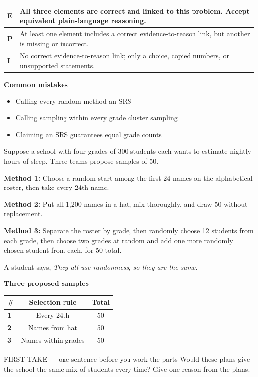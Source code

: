 \documentclass[11pt]{article}
\begin{document}
{\small\renewcommand{\arraystretch}{1.25}
\noindent\begin{tabular}{|p{0.5in}|p{5.9in}|}
\hline
\textbf{E} & All three elements are correct and linked to this problem. Accept equivalent plain-language reasoning. \\ \hline
\textbf{P} & At least one element includes a correct evidence-to-reason link, but another is missing or incorrect. \\ \hline
\textbf{I} & No correct evidence-to-reason link; only a choice, copied numbers, or unsupported statements. \\ \hline
\end{tabular}}

\textbf{Common mistakes}
\begin{itemize}[leftmargin=1.5em,itemsep=2pt,topsep=2pt]
  \item Calling every random method an SRS
  \item Calling sampling within every grade cluster sampling
  \item Claiming an SRS guarantees equal grade counts
\end{itemize}

\clearpage
{}

Suppose a school with four grades of 300 students each wants to estimate nightly hours of sleep. Three teams propose samples of 50.\par\smallskip \textbf{Method 1:} Choose a random start among the first 24 names on the alphabetical roster, then take every 24th name.\par \textbf{Method 2:} Put all 1{,}200 names in a hat, mix thoroughly, and draw 50 without replacement.\par \textbf{Method 3:} Separate the roster by grade, then randomly choose 12 students from each grade, then choose two grades at random and add one more randomly chosen student from each, for 50 total.\par\smallskip A student says, \emph{They all use randomness, so they are the same.}\par
\begin{center}
\textbf{Three proposed samples}\par\smallskip
\begin{tabular}{|l|c|c|}
\hline
\textbf{\#} & \textbf{Selection rule} & \textbf{Total} \\ \hline
\textbf{1} & Every 24th & 50 \\ \hline
\textbf{2} & Names from hat & 50 \\ \hline
\textbf{3} & Names within grades & 50 \\ \hline
\end{tabular}
\end{center}
\begin{firsttakebox}{FIRST TAKE --- one sentence before you work the parts}
Would these plans give the school the same mix of students every time? Give one reason from the plans.\par
{}
\end{firsttakebox}
\end{document}
